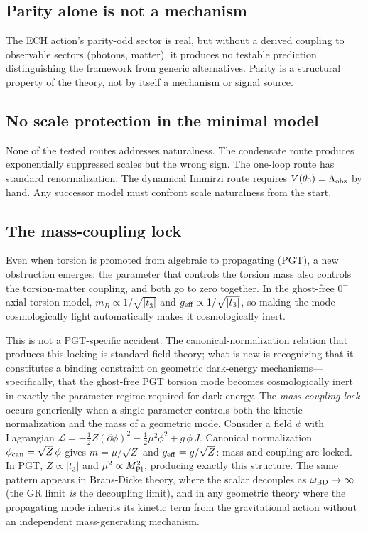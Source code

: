 \documentclass[aps,prd,twocolumn,superscriptaddress,showpacs,preprintnumbers,
  nofootinbib,longbibliography,floatfix]{revtex4-2}
\newcommand{\Lobs}{\Lambda_{\rm obs}}
\newcommand{\MPl}{M_{\rm Pl}}
\begin{document}
\subsection{Parity alone is not a mechanism}

The ECH action's parity-odd sector is real, but without a derived
coupling to observable sectors (photons, matter), it produces no testable
prediction distinguishing the framework from generic alternatives. Parity
is a structural property of the theory, not by itself a mechanism or
signal source.

\subsection{No scale protection in the minimal model}

None of the tested routes addresses naturalness. The condensate route
produces exponentially suppressed scales but the wrong sign.
The one-loop route has standard renormalization.
The dynamical Immirzi route requires $V(\theta_0) = \Lobs$ by hand.
Any successor model must confront scale naturalness from the start.

\subsection{The mass-coupling lock}\label{sec:lesson6}

Even when torsion is promoted from algebraic to propagating (PGT), a new
obstruction emerges: the parameter that controls the torsion mass also
controls the torsion-matter coupling, and both go to zero together. In
the ghost-free $0^-$ axial torsion model, $m_B \propto 1/\sqrt{|t_3|}$
and $g_{\rm eff} \propto 1/\sqrt{|t_3|}$, so making the mode
cosmologically light automatically makes it cosmologically inert.

This is not a PGT-specific accident.
The canonical-normalization relation that produces this locking is
standard field theory; what is new is recognizing that it constitutes a
binding constraint on geometric dark-energy mechanisms---specifically,
that the ghost-free PGT torsion mode becomes cosmologically inert in
exactly the parameter regime required for dark energy.
The \textit{mass-coupling lock}
occurs generically when a single parameter controls both the kinetic
normalization and the mass of a geometric mode. Consider a field $\phi$
with Lagrangian $\mathcal{L} = -\tfrac{1}{2}Z(\partial\phi)^2
- \tfrac{1}{2}\mu^2\phi^2 + g\,\phi\,J$. Canonical normalization
$\phi_{\rm can} = \sqrt{Z}\,\phi$ gives $m = \mu/\sqrt{Z}$ and
$g_{\rm eff} = g/\sqrt{Z}$: mass and coupling are locked. In PGT,
$Z \propto |t_3|$ and $\mu^2 \propto \MPl^2$, producing exactly this
structure. The same pattern appears in Brans-Dicke theory, where the
scalar decouples as $\omega_{\rm BD} \to \infty$ (the GR limit
\textit{is} the decoupling limit), and in any geometric theory where the
propagating mode inherits its kinetic term from the gravitational action
without an independent mass-generating mechanism.
\end{document}
